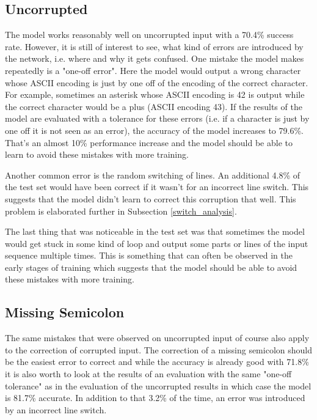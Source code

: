 \subsection{Uncorrupted}

The model works reasonably well on uncorrupted input with a 70.4\% success rate. However, it is still of interest to see, what kind of errors are introduced by the network, i.e. where and why it gets confused. One mistake the model makes repeatedly is a "one-off error". Here the model would output a wrong character whose ASCII encoding is just by one off of the encoding of the correct character. For example, sometimes an asterisk whose ASCII encoding is 42 is output while the correct character would be a plus (ASCII encoding 43). If the results of the model are evaluated with a tolerance for these errors (i.e. if a character is just by one off it is not seen as an error), the accuracy of the model increases to 79.6\%. That's an almost 10\% performance increase and the model should be able to learn to avoid these mistakes with more training.

Another common error is the random switching of lines. An additional 4.8\% of the test set would have been correct if it wasn't for an incorrect line switch. This suggests that the model didn't learn to correct this corruption that well. This problem is elaborated further in Subsection \ref{switch_analysis}.

The last thing that was noticeable in the test set was that sometimes the model would get stuck in some kind of loop and output some parts or lines of the input sequence multiple times. This is something that can often be observed in the early stages of training which suggests that the model should be able to avoid these mistakes with more training.

\subsection{Missing Semicolon}

The same mistakes that were observed on uncorrupted input of course also apply to the correction of corrupted input. The correction of a missing semicolon should be the easiest error to correct and while the accuracy is already good with 71.8\% it is also worth to look at the results of an evaluation with the same "one-off tolerance" as in the evaluation of the uncorrupted results in which case the model is 81.7\% accurate. In addition to that 3.2\% of the time, an error was introduced by an incorrect line switch.

